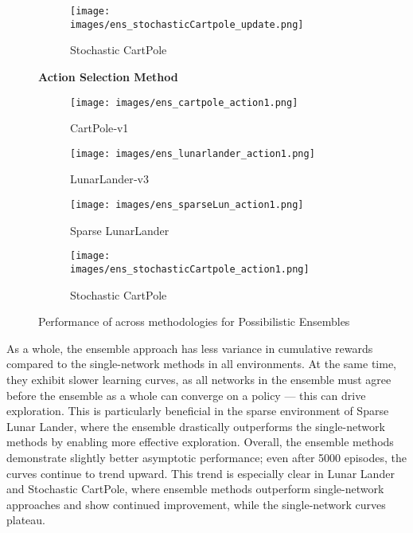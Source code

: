 \documentclass[11pt,a4paper]{report}
\begin{document}
{\begin{figure}[ht]
\begin{subfigure}[b]{0.24\textwidth}
  \end{subfigure}
  \hfill 
  \begin{subfigure}[b]{0.24\textwidth}
    \centering
    \texttt{[image: images/ens\_stochasticCartpole\_update.png]}
    \caption{Stochastic CartPole} 
    
  \end{subfigure}

  \vspace{1em} 

  
  \par\noindent\textbf{Action Selection Method}\par\nopagebreak
  \vspace{0.5em} 

  
   \begin{subfigure}[b]{0.24\textwidth}
    \centering
    \texttt{[image: images/ens\_cartpole\_action1.png]}
    \caption{CartPole‐v1} 
    
   \end{subfigure}
   \hfill 
   \begin{subfigure}[b]{0.24\textwidth}
    \centering
    \texttt{[image: images/ens\_lunarlander\_action1.png]}
    \caption{LunarLander‐v3} 
    
   \end{subfigure}
   \hfill 
     \begin{subfigure}[b]{0.24\textwidth}
    \centering
    \texttt{[image: images/ens\_sparseLun\_action1.png]}
    \caption{Sparse LunarLander} 
    
   \end{subfigure}
   \hfill 
   \begin{subfigure}[b]{0.24\textwidth}
    \centering
    \texttt{[image: images/ens\_stochasticCartpole\_action1.png]}
    \caption{Stochastic CartPole} 
    
   \end{subfigure}

  
  \caption{Performance of across methodologies for Possibilistic Ensembles} 
  \label{fig:ens_combined} 
\end{figure}

} 

As a whole, the ensemble approach has less variance in cumulative rewards compared to the single-network methods in all environments. At the same time, they exhibit slower learning curves, as all networks in the ensemble must agree before the ensemble as a whole can converge on a policy — this can drive exploration. This is particularly beneficial in the sparse environment of Sparse Lunar Lander, where the ensemble drastically outperforms the single-network methods by enabling more effective exploration. Overall, the ensemble methods demonstrate slightly better asymptotic performance; even after 5000 episodes, the curves continue to trend upward. This trend is especially clear in Lunar Lander and Stochastic CartPole, where ensemble methods outperform single-network approaches and show continued improvement, while the single-network curves plateau.
\end{document}
